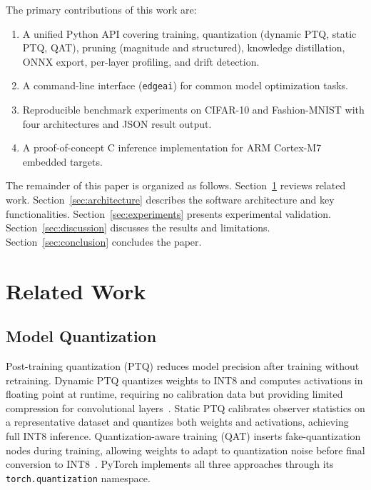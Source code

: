 \documentclass[10pt,twocolumn]{article}
\begin{document}
The primary contributions of this work are:
\begin{enumerate}
    \item A unified Python API covering training, quantization (dynamic PTQ, static PTQ, QAT), pruning (magnitude and structured), knowledge distillation, ONNX export, per-layer profiling, and drift detection.
    \item A command-line interface (\texttt{edgeai}) for common model optimization tasks.
    \item Reproducible benchmark experiments on CIFAR-10 and Fashion-MNIST with four architectures and JSON result output.
    \item A proof-of-concept C inference implementation for ARM Cortex-M7 embedded targets.
\end{enumerate}

The remainder of this paper is organized as follows.
Section~\ref{sec:related} reviews related work.
Section~\ref{sec:architecture} describes the software architecture and key functionalities.
Section~\ref{sec:experiments} presents experimental validation.
Section~\ref{sec:discussion} discusses the results and limitations.
Section~\ref{sec:conclusion} concludes the paper.

\section{Related Work}
\label{sec:related}

\subsection{Model Quantization}

Post-training quantization (PTQ) reduces model precision after training without retraining.
Dynamic PTQ quantizes weights to INT8 and computes activations in floating point at runtime, requiring no calibration data but providing limited compression for convolutional layers~\cite{ptq}.
Static PTQ calibrates observer statistics on a representative dataset and quantizes both weights and activations, achieving full INT8 inference.
Quantization-aware training (QAT) inserts fake-quantization nodes during training, allowing weights to adapt to quantization noise before final conversion to INT8~\cite{qat}.
PyTorch implements all three approaches through its \texttt{torch.quantization} namespace.
\end{document}
